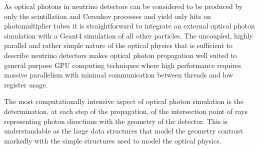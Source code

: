 \documentclass[a4paper]{jpconf}
\begin{document}




As optical photons in neutrino detectors can be considered to be produced 
by only the scintillation and Cerenkov processes and yield only hits 
on photomultiplier tubes it is straightforward to integrate an
external optical photon simulation with a Geant4 simulation of all other particles.
%
The uncoupled, highly parallel and rather simple nature of the optical physics 
that is sufficient to describe neutrino detectors makes optical photon propagation 
well suited to general purpose GPU computing techniques where
high performance requires massive parallelism with minimal communication between threads
and low register usage\cite{megakernels}.  

The most computationally intensive aspect of optical photon simulation
is the determination, at each step of the propagation, of the intersection point 
of rays representing photon directions with the geometry of the detector. This 
is understandable as the large data structures that model the geometry contrast
markedly with the simple structures used to model the optical physics.

\end{document}
